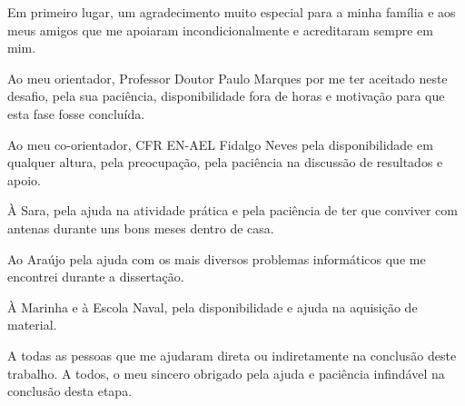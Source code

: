 
\begin{acknowledgements}

Em primeiro lugar, um agradecimento muito especial para a minha família e aos meus amigos que me apoiaram incondicionalmente e acreditaram sempre em mim.\par
Ao meu orientador, Professor Doutor Paulo Marques por me ter aceitado neste desafio, pela sua paciência, disponibilidade fora de horas e motivação para que esta fase fosse concluída.\par
Ao meu co-orientador, CFR EN-AEL Fidalgo Neves pela disponibilidade em qualquer altura, pela preocupação, pela paciência na discussão de resultados e apoio. \par
À Sara, pela ajuda na atividade prática e pela paciência de ter que conviver com antenas durante uns bons meses dentro de casa.\par
Ao Araújo pela ajuda com os mais diversos problemas informáticos que me encontrei durante a dissertação.\par
À Marinha e à Escola Naval, pela disponibilidade e ajuda na aquisição de material.\par
A todas as pessoas que me ajudaram direta ou indiretamente na conclusão deste trabalho. A todos, o meu sincero obrigado pela ajuda e paciência infindável na conclusão desta etapa.

\end{acknowledgements}





